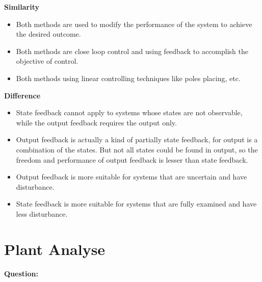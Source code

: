 \documentclass[12pt, oneside]{article}
\begin{document}
\textbf{Similarity}
\begin{itemize}
    \item Both methods are used to modify the performance of the system to achieve the desired outcome.
    \item Both methods are close loop control and using feedback to accomplish the objective of control.
    \item Both methods using linear controlling techniques like poles placing, etc.
\end{itemize}

\textbf{Difference}
\begin{itemize}
    \item State feedback cannot apply to systems whose states are not observable, while the output feedback requires the output only.
    \item Output feedback is actually a kind of partially state feedback, for output is a combination of the states. But not all states could be found in output, so the freedom and performance of output feedback is lesser than state feedback.
    \item Output feedback is more suitable for systems that are uncertain and have disturbance.
    \item State feedback is more suitable for systems that are fully examined and have less disturbance.
\end{itemize}



\section{Plant Analyse}
\label{section:plant analyse}
\textbf{Question:}
\end{document}
